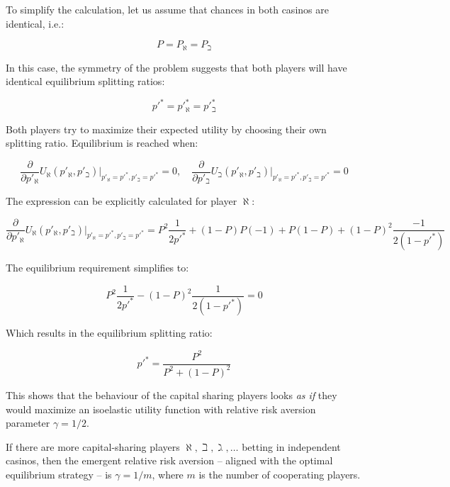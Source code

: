 \documentclass{article}
\theoremstyle{definition}
\begin{document}
To simplify the calculation, let us assume that chances in both casinos are identical, i.e.:

\begin{equation}
    P = P_\aleph = P_\beth
\end{equation}

In this case, the symmetry of the problem suggests that both players will have identical equilibrium splitting ratios:

\begin{equation}
    p'^* = p'^*_\aleph = p'^*_\beth
\end{equation}

Both players try to maximize their expected utility by choosing their own splitting ratio. Equilibrium is reached when:

\begin{equation}
    \frac{\partial}{\partial p'_\aleph} 
    U_\aleph(p'_\aleph, p'_\beth) 
    \Bigr|_{p'_\aleph = p'^*,p'_\beth = p'^*} = 0, \quad
    \frac{\partial}{\partial p'_\beth} 
    U_\beth(p'_\aleph, p'_\beth) 
    \Bigr|_{p'_\aleph = p'^*,p'_\beth = p'^*} = 0
\end{equation}

The expression can be explicitly calculated for player $\aleph$:

\begin{equation}
    \frac{\partial}{\partial p'_\aleph} 
    U_\aleph(p'_\aleph, p'_\beth) 
    \Bigr|_{p'_\aleph = p'^*,p'_\beth = p'^*}  = 
    P^2 \frac{1}{2 p'^*} + (1-P)P (-1) + P(1-P) +
    (1-P)^2 \frac{-1}{2 (1-p'^*)}
\end{equation}

The equilibrium requirement simplifies to:

\begin{equation} 
    P^2 \frac{1}{2 p'^*}  -
    (1-P)^2 \frac{1}{2 (1-p'^*)} =0
\end{equation}

Which results in the equilibrium splitting ratio:

\begin{equation}
    p'^* = \frac{P^2}{P^2+(1-P)^2}
\end{equation}

This shows that the behaviour of the capital sharing players looks \emph{as if} they would maximize an isoelastic utility function with relative risk aversion parameter $\gamma = 1/2$.

If there are more capital-sharing players $\aleph, \beth, \gimel, \dots$ betting in independent casinos, then the emergent relative risk aversion  -- aligned with the optimal equilibrium strategy -- is $\gamma=1/m$, where $m$ is the number of cooperating players.
\end{document}

